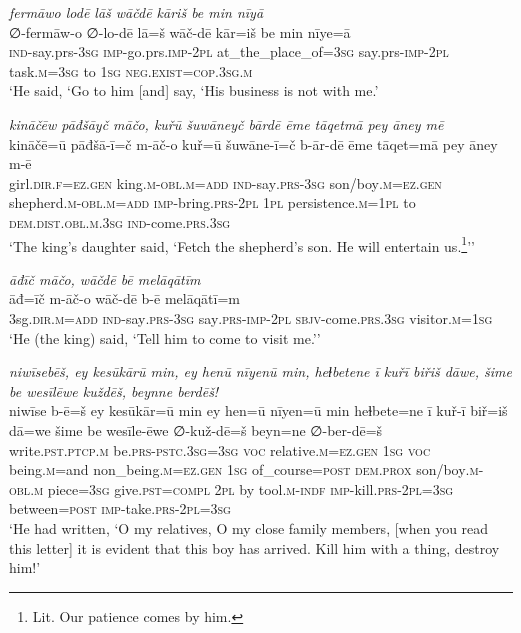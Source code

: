 \ea \label{ŠJ.74}
\textit{fermāwo lodē lāš wāčdē kāriš be min nīyā} \\ 
\gll ∅-fermāw-o ∅-lo-dē lā=š wāč-dē kār=iš be min nīye=ā \\ 
 \textsc{ind-}say.prs\textsc{-3sg} \textsc{imp-}go.prs.\textsc{imp-}\textsc{2pl} at\_the\_place\_of\textsc{=3sg} say.prs-\textsc{imp-}\textsc{2pl} task\textsc{.m}\textsc{=3sg} to \textsc{1sg} \textsc{\textsc{neg.}exist}\textsc{=cop}\textsc{.3sg}\textsc{.m} \\ 
\glt `He said, ‘Go to him [and] say, ‘His business is not with me.'
\z 
 
\ea \label{KŠ.40}
\textit{kināčēw pāđšāyč māčo, kuřū šuwāneyč bārdē ēme tāqetmā pey āney mē} \\ 
\gll kināčē=ū pāđšā-ī=č m-āč-o kuř=ū šuwāne-ī=č b-ār-dē ēme tāqet=mā pey āney m-ē \\ 
 girl\textsc{.dir}\textsc{.f}\textsc{=ez.gen} king\textsc{.m}\textsc{-obl}\textsc{.m}\textsc{=add} \textsc{ind-}say\textsc{.prs}\textsc{-3sg} son/boy\textsc{.m}\textsc{=ez.gen} shepherd\textsc{.m}\textsc{-obl}\textsc{.m}\textsc{=add} \textsc{imp-}bring\textsc{.prs}-\textsc{2pl} \textsc{1pl} persistence\textsc{.m}\textsc{=\textsc{1pl}} to \textsc{dem.dist}\textsc{.obl}\textsc{.m}\textsc{.3sg} \textsc{ind-}come\textsc{.prs}\textsc{.3sg} \\ 
\glt `The king’s daughter said, ‘Fetch the shepherd’s son. He will entertain us.\footnote{Lit. Our patience comes by him.}’'
\z 
 
\ea \label{KŠ.52}
\textit{āđīč māčo, wāčdē bē melāqātīm} \\ 
\gll āđ=īč m-āč-o wāč-dē b-ē melāqātī=m \\ 
 3sg\textsc{.dir}\textsc{.m}\textsc{=add} \textsc{ind-}say\textsc{.prs}\textsc{-3sg} say\textsc{.prs}-\textsc{imp-}\textsc{2pl} \textsc{sbjv-}come\textsc{.prs}\textsc{.3sg} visitor\textsc{.m}\textsc{=\textsc{1sg}} \\ 
\glt `He (the king) said, ‘Tell him to come to visit me.’'
\z 
 
\ea \label{KŠ.72}
\textit{niwīsebēš, ey kesūkārū min, ey henū nīyenū min, heɫbetene ī kuřī biřiš dāwe, šime be wesīlēwe kuždēš, beynne berdēš!} \\ 
\gll niwīse b-ē=š ey kesūkār=ū min ey hen=ū nīyen=ū min heɫbete=ne ī kuř-ī biř=iš dā=we šime be wesīle-ēwe ∅-kuž-dē=š beyn=ne ∅-ber-dē=š \\ 
 write\textsc{.pst}\textsc{.ptcp}\textsc{.m} be\textsc{.prs}\textsc{-pstc}\textsc{.3sg}\textsc{=3sg} \textsc{voc} relative\textsc{.m}\textsc{\textsc{=ez.gen}} \textsc{1sg} \textsc{voc} being\textsc{.m}=and non\_being\textsc{.m}\textsc{\textsc{=ez.gen}} \textsc{1sg} of\_course\textsc{=\textsc{post}} \textsc{dem.prox} son/boy\textsc{.m}\textsc{-obl}\textsc{.m} piece\textsc{=3sg} give\textsc{.pst}\textsc{=compl} \textsc{2pl} by tool\textsc{.m}\textsc{-indf} \textsc{imp-}kill\textsc{.prs}-\textsc{2pl}\textsc{=3sg} between\textsc{=\textsc{post}} \textsc{imp-}take\textsc{.prs}-\textsc{2pl}\textsc{=3sg} \\ 
\glt `He had written, ‘O my relatives, O my close family members, [when you read this letter] it is evident that this boy has arrived. Kill him with a thing, destroy him!'
\z 
 
